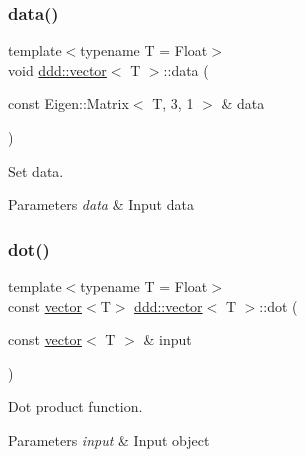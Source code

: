 \subsubsection{\texorpdfstring{data()}{data()}}
{\footnotesize\ttfamily template$<$typename T = Float$>$ \\
void \hyperlink{classddd_1_1vector}{ddd\+::vector}$<$ T $>$\+::data (\begin{DoxyParamCaption}\item[{const Eigen\+::\+Matrix$<$ T, 3, 1 $>$ \&}]{data }\end{DoxyParamCaption})\hspace{0.3cm}{\ttfamily [inline]}}



Set data. 


\begin{DoxyParams}{Parameters}
{\em data} & Input data \\
\hline
\end{DoxyParams}
\mbox{\label{classddd_1_1vector_a61e3ccdb85f4d41c142c80b429808baf}} 
\subsubsection{\texorpdfstring{dot()}{dot()}}
{\footnotesize\ttfamily template$<$typename T = Float$>$ \\
const \hyperlink{classddd_1_1vector}{vector}$<$T$>$ \hyperlink{classddd_1_1vector}{ddd\+::vector}$<$ T $>$\+::dot (\begin{DoxyParamCaption}\item[{const \hyperlink{classddd_1_1vector}{vector}$<$ T $>$ \&}]{input }\end{DoxyParamCaption})\hspace{0.3cm}{\ttfamily [inline]}}



Dot product function. 


\begin{DoxyParams}{Parameters}
{\em input} & Input object \\
\hline
\end{DoxyParams}
\mbox{\label{classddd_1_1vector_a860847a7c7c93e52b4a83af722eb60f7}} 
